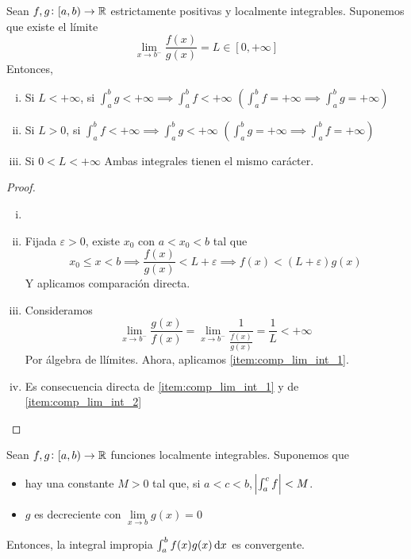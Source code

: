 \begin{prop}%
	Sean $f,g \colon [a,b) \to \mathbb{R}$ estrictamente positivas y localmente
	integrables. Suponemos que existe el límite
	\[
		\lim_{x \to b^-} \frac{f(x)}{g(x)} = L \in [0,+\infty]
	\]
	Entonces, \begin{enumerate}[i)]
		\item\label{item:comp_lim_int_1}
			Si $L < +\infty$, si $\int^b_a g < +\infty \implies \int^b_af <
			+\infty$ $\left( \int^b_a f = +\infty \implies \int^b_a g =
			+\infty\right)$
		\item\label{item:comp_lim_int_2}
			Si $L > 0$, si $\int^b_a f < +\infty \implies \int^b_a g <
			+\infty$ $\left(\int^b_a g = +\infty \implies \int^b_a f =
			+\infty\right)$
		\item Si $0 < L < +\infty$ Ambas integrales tienen el mismo carácter.
	\end{enumerate}
\end{prop}

\begin{proof}
	\begin{enumerate}[i)]
		\item[]
		\item Fijada $\varepsilon > 0$, existe $x_0$ con $a < x_0 < b$ tal que
			\[
				x_0 \leq x < b \implies \frac{f(x)}{g(x)} < L +
				\varepsilon \implies f(x) < (L+\varepsilon)g(x)
			\]
			Y aplicamos comparación directa.
		\item Consideramos
			\[
				\lim_{x \to b^-} \frac{g(x)}{f(x)} = \lim_{x \to b^-}
				\frac{1}{\frac{f(x)}{g(x)}} = \frac{1}{L} < +\infty
			\]
			Por álgebra de llímites. Ahora, aplicamos
			\ref{item:comp_lim_int_1}.
		\item Es consecuencia directa de \ref{item:comp_lim_int_1} y de
			\ref{item:comp_lim_int_2}
	\end{enumerate}
\end{proof}

\begin{prop}
	Sean $f,g \colon [a,b) \to \mathbb{R}$ funciones localmente integrables. Suponemos
	que
	\begin{itemize}
		\item hay una constante $M > 0$ tal que, si $a < c < b$,
			$\abs{\int^c_a f} < M$.
		\item $g$ es decreciente con $\lim\limits_{x \to b} g(x) = 0$
	\end{itemize}
	Entonces, la integral impropia $\int^b_a f(x)g(x)\dif x$ es convergente.
\end{prop}

